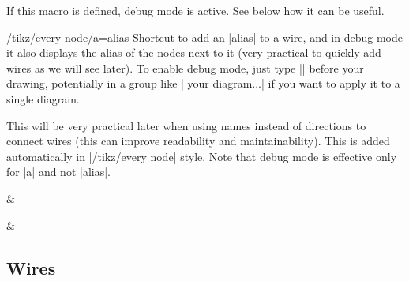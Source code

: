 \documentclass[a4paper]{ltxdoc}
\begin{document}
\begin{command}{\zxDebugMode{}}
  If this macro is defined, debug mode is active. See below how it can be useful.
\end{command}
\begin{stylekey}{/tikz/every node/a=alias}
  Shortcut to add an |alias| to a wire, and in debug mode it also displays the alias of the nodes next to it (very practical to quickly add wires as we will see later). To enable debug mode, just type |\def\zxDebugMode{}| before your drawing, potentially in a group like |{\def\zxDebugMode{} your diagram...}| if you want to apply it to a single diagram.

  This will be very practical later when using names instead of directions to connect wires (this can improve readability and maintainability). This is added automatically in |/tikz/every node| style. Note that debug mode is effective only for |a| and not |alias|.
\begin{codeexample}[width=3cm]
  \begin{ZX}
    \zxX[a=A]{} & \zxZ[a=B]{\beta}
    \ar[from=A,to=B]
  \end{ZX}
  {\def\zxDebugMode{} %
    \begin{ZX}
      \zxX[a=A]{} & \zxZ[a=B]{\beta}
      \ar[from=A,to=B]
    \end{ZX}
  }
\end{codeexample}
\end{stylekey}


\subsection{Wires}
\end{document}
